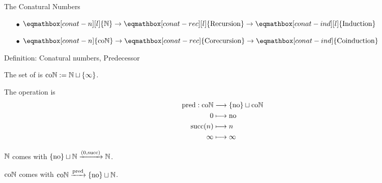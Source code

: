
\begin{frame}{The Conatural Numbers}

  \begin{itemize}[nosep]
    \item[$\bullet$] $\eqmathbox[conat-n][l]{\N} \to \eqmathbox[conat-rec][l]{\text{Recursion}} \to \eqmathbox[conat-ind][l]{\text{Induction}}$
    \item[$\bullet$] $\eqmathbox[conat-n]{\coN} \to \eqmathbox[conat-rec]{\text{Corecursion}} \to \eqmathbox[conat-ind]{\text{Coinduction}}$
  \end{itemize}

  \pause

  \begin{block}{Definition: Conatural numbers, Predecessor}

    \par The set of  is $\mathrm{co}\mathbb{N} := \mathbb{N} \sqcup \{\infty\}$.
    \par The  operation is
    \begin{align*}
      \operatorname{pred} : \mathrm{co}\mathbb{N}
      &\longrightarrow \{\mathrm{no}\} \sqcup \mathrm{co}\mathbb{N}
      \\
      0
      &\longmapsto \mathrm{no}
      \\
      \operatorname{succ}(n)
      &\longmapsto n
      \\
      \infty
      &\longmapsto \infty
    \end{align*}
  \end{block}

  \pause

  \par $\mathbb{N}$ comes with $\{\mathrm{no}\} \sqcup \mathbb{N} \xrightarrow{(0, \operatorname{succ})} \mathbb{N}$.
  \par $\mathrm{co}\mathbb{N}$ comes with $\mathrm{co}\mathbb{N} \xrightarrow{\operatorname{pred}} \{\mathrm{no}\} \sqcup \mathbb{N}$.

\end{frame}

